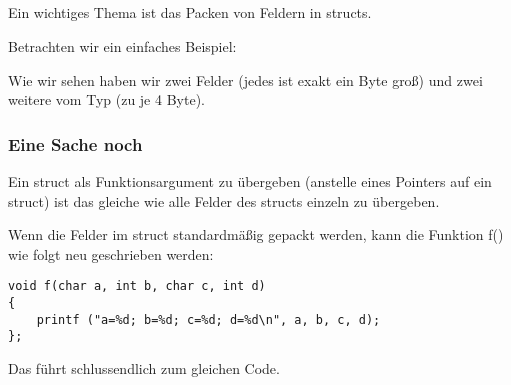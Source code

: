 \subsection{\StructurePackingSectionName}
\label{structure_packing}
Ein wichtiges Thema ist das Packen von Feldern in structs.

Betrachten wir ein einfaches Beispiel:


Wie wir sehen haben wir zwei \Tchar Felder (jedes ist exakt ein Byte groß) und zwei weitere vom Typ \Tint (zu je 4
Byte).





\subsubsection{Eine Sache noch}
Ein struct als Funktionsargument zu übergeben (anstelle eines Pointers auf ein struct) ist das gleiche wie alle Felder
des structs einzeln zu übergeben.

Wenn die Felder im struct standardmäßig gepackt werden, kann die Funktion f() wie folgt neu geschrieben werden:

\begin{lstlisting}[style=customc]
void f(char a, int b, char c, int d)
{
    printf ("a=%d; b=%d; c=%d; d=%d\n", a, b, c, d);
};
\end{lstlisting}
Das führt schlussendlich zum gleichen Code.
